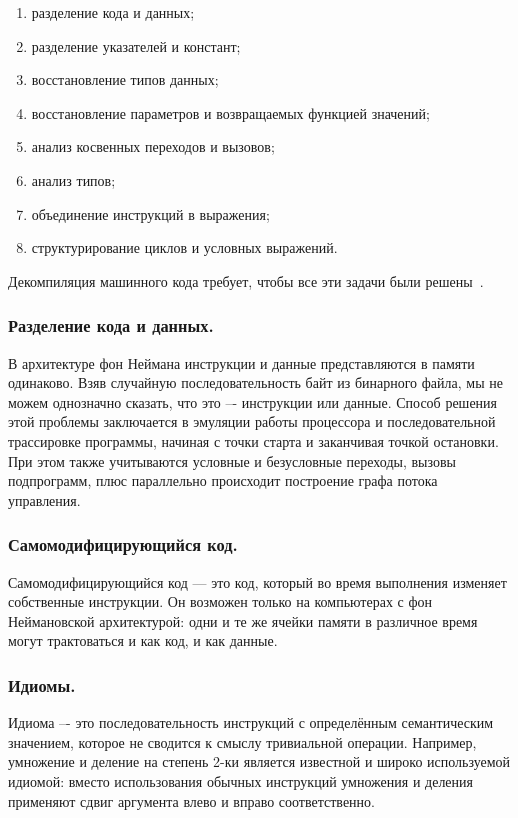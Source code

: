 \begin{enumerate}
\item разделение кода и данных;
\item разделение указателей и констант;
\item восстановление типов данных;
\item восстановление параметров и возвращаемых функцией значений;
\item анализ косвенных переходов и вызовов;
\item анализ типов;
\item объединение инструкций в выражения;
\item структурирование циклов и условных выражений.
\end{enumerate}

Декомпиляция машинного кода требует, чтобы все эти задачи были решены~\cite{problems}.

\subsubsection*{Разделение кода и данных.}
В архитектуре фон Неймана инструкции и данные представляются в памяти одинаково. Взяв случайную последовательность байт из бинарного файла, мы не можем однозначно сказать, что это –- инструкции или данные. Способ решения этой проблемы заключается в эмуляции работы процессора и последовательной трассировке программы, начиная с точки старта и заканчивая точкой остановки. При этом также учитываются условные и безусловные переходы, вызовы подпрограмм, плюс параллельно происходит построение графа потока управления.
\subsubsection*{Самомодифицирующийся код.}
Самомодифицирующийся код --- это код, который во время выполнения изменяет собственные инструкции. Он возможен только на компьютерах с фон Неймановской архитектурой: одни и те же ячейки памяти в различное время могут трактоваться и как код, и как данные.
\subsubsection*{Идиомы.}
Идиома –- это последовательность инструкций с определённым семантическим значением, которое не сводится к смыслу тривиальной операции. Например, умножение и деление на степень 2-ки является известной и широко используемой идиомой: вместо использования обычных инструкций умножения и деления применяют сдвиг аргумента влево и вправо соответственно.

